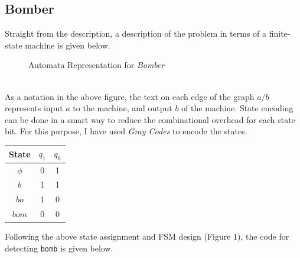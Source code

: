 \documentclass[a4paper, 11pt]{article}
\begin{document}
\subsection{Bomber}
Straight from the description, a description of the problem in terms of a finite-state machine is given below.
\begin{figure}[h]
\centering

\caption{Automata Representation for \emph{Bomber}}
\end{figure} \\

As a notation in the above figure, the text on each edge of the graph $a / b$ represents input $a$ to the machine, and output $b$ of the machine. State encoding can be done in a smart way to reduce the combinational overhead for each state bit. For this purpose, I have used \emph{Gray Codes} to encode the states.
\begin{center}
\begin{tabular}{| c | c | c |}
\hline
\bf State & \bf $q_1$ & \bf $q_0$\\
\hline
$\phi$ & 0 & 1 \\
$b$ & 1 & 1 \\
$bo$ &1 & 0 \\
$bom$ & 0 & 0\\
\hline
\end{tabular}
\end{center}
Following the above state assignment and FSM design (Figure 1), the code for detecting \texttt{bomb} is given below.
\end{document}
